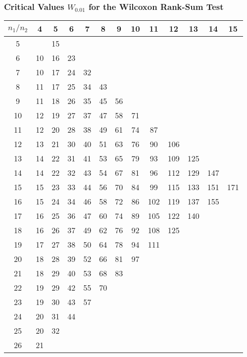 \medskip
\subsubsection*{Critical Values $W_{0.01}$ for the Wilcoxon Rank-Sum Test}

\begin{tabular}[t]{c|cccccccccccc}
$n_1/n_2$ & 4 & 5 & 6 & 7 & 8 & 9 & 10 & 11 & 12 & 13 & 14 & 15 \\
\hline
 5 &    & 15 \\
 6 & 10 & 16 & 23 \\
 7 & 10 & 17 & 24 & 32 \\
 8 & 11 & 17 & 25 & 34 & 43 \\
 9 & 11 & 18 & 26 & 35 & 45 & 56 \\
10 & 12 & 19 & 27 & 37 & 47 & 58 & 71 \\
11 & 12 & 20 & 28 & 38 & 49 & 61 & 74 &  87 \\
12 & 13 & 21 & 30 & 40 & 51 & 63 & 76 &  90 & 106 \\
13 & 14 & 22 & 31 & 41 & 53 & 65 & 79 &  93 & 109 & 125 \\
14 & 14 & 22 & 32 & 43 & 54 & 67 & 81 &  96 & 112 & 129 & 147 \\
15 & 15 & 23 & 33 & 44 & 56 & 70 & 84 &  99 & 115 & 133 & 151 & 171 \\
16 & 15 & 24 & 34 & 46 & 58 & 72 & 86 & 102 & 119 & 137 & 155 \\
17 & 16 & 25 & 36 & 47 & 60 & 74 & 89 & 105 & 122 & 140 \\
18 & 16 & 26 & 37 & 49 & 62 & 76 & 92 & 108 & 125 \\
19 & 17 & 27 & 38 & 50 & 64 & 78 & 94 & 111 \\
20 & 18 & 28 & 39 & 52 & 66 & 81 & 97 \\
21 & 18 & 29 & 40 & 53 & 68 & 83 \\
22 & 19 & 29 & 42 & 55 & 70 \\
23 & 19 & 30 & 43 & 57 \\
24 & 20 & 31 & 44 \\
25 & 20 & 32 \\
26 & 21 \\
\hline
\end{tabular}
